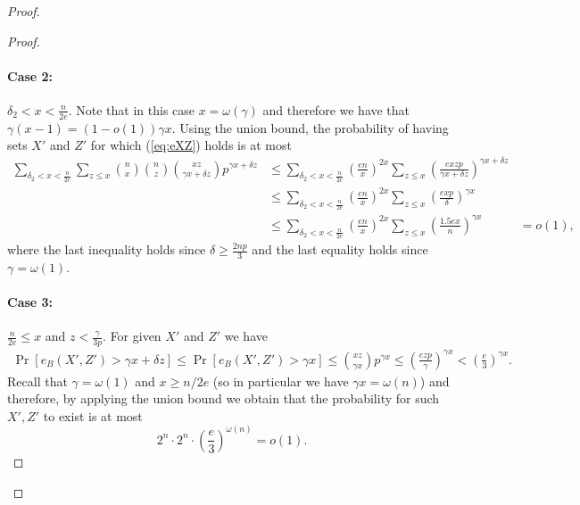 \documentclass{article}
\begin{document}
\begin{proof}
\begin{proof}
			\paragraph*{Case 2:} 
			$\delta_2 < x  < \frac{n}{2e}$.
			Note that in this case $x = \omega(\gamma)$ and therefore we have that $\gamma(x-1)=(1-o(1))\gamma x$.
			Using the union bound, the probability of having sets $X'$ and $Z'$ for which (\ref{eq:eXZ}) holds is at most 
			\begin{align*}
			\sum_{\delta_2 < x < \frac{n}{2e}} \sum_{z\le x} \binom{n}{x} \binom{n}{z} \binom{xz}{\gamma x + \delta z} p^{\gamma x + \delta z} &\le \sum_{\delta_2 < x < \frac{n}{2e}} \left(\frac{en}{x} \right)^{2x} \sum_{z \le x} \left(\frac{exzp}{\gamma x + \delta z} \right)^{\gamma x + \delta z} \\
			&\le \sum_{\delta_2 < x < \frac{n}{2e}} \left(\frac{en}{x} \right)^{2x} \sum_{z \le x} \left(\frac{exp}{\delta} \right)^{\gamma x} \\
			&\le \sum_{\delta_2 < x < \frac{n}{2e}} \left(\frac{en}{x} \right)^{2x} \sum_{z \le x} \left(\frac{1.5ex}{n} \right)^{\gamma x}
			&=o(1),		
			\end{align*}
			where the last inequality holds since $\delta\geq \frac{2np}{3}$ and the last equality holds since $\gamma=\omega(1)$. 
			
			
			\paragraph*{Case 3:}
			$\frac{n}{2e} \le x$ and $z < \frac{\gamma}{3p}$.
			For given $X'$ and $Z'$ we have
			\begin{align*}
			\Pr\left[e_B(X',Z') > \gamma x + \delta z \right] \le \Pr\left[e_B(X',Z') > \gamma x \right] \le \binom{xz}{\gamma x}p^{\gamma x} \le \left(\frac{ezp}{\gamma} \right)^{\gamma x} < \left(\frac{e}{3} \right)^{\gamma x}.
			\end{align*}
			Recall that $\gamma = \omega(1)$ and $x\geq n/2e$ (so in particular we have $\gamma x=\omega(n)$) and therefore, by applying the union bound we obtain that the probability for such $X',Z'$ to exist is at most
			$$2^n\cdot  2^n\cdot \left(\frac{e}{3}\right)^{\omega(n)}=o(1).$$
			
			

\end{proof}
\end{proof}
\end{document}
